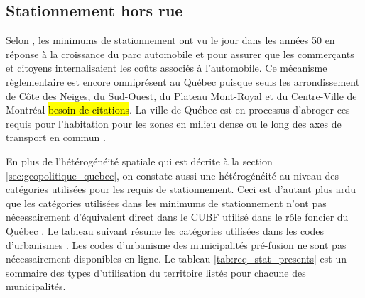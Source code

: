   \subsection{Stationnement hors rue}
  Selon \textcite{Shoup:HighCost:2005}, les minimums de stationnement ont vu le jour dans les années 50 en réponse à la croissance du parc automobile et pour assurer que les commerçants et citoyens internalisaient les coûts associés à l'automobile. Ce mécanisme règlementaire est encore omniprésent au Québec puisque seuls les arrondissement de Côte des Neiges, du Sud-Ouest, du Plateau Mont-Royal et du Centre-Ville de Montréal \hl{besoin de citations}. La ville de Québec est en processus d'abroger ces requis pour l'habitation pour les zones en milieu dense ou le long des axes de transport en commun \parencite{VilledeQuebec:AdoptionReglement:2024}.\par
  En plus de l'hétérogénéité spatiale qui est décrite à la section \ref{sec:geopolitique_quebec}, on constate aussi une hétérogénéité au niveau des catégories utilisées pour les requis de stationnement. Ceci est d'autant plus ardu que les catégories utilisées dans les minimums de stationnement n'ont pas nécessairement d'équivalent direct dans le \ac{CUBF} utilisé dans le rôle foncier du Québec \parencite[Annexe 2C.1]{GouvernementduQuebec:ManuelEvaluation:2024}. Le tableau suivant résume les catégories utilisées dans les codes d'urbanismes \parencite{VilledeQuebec:AdoptionReglement:2024,VilledeQuebec:ReglementZonage:1995}. Les codes d'urbanisme des municipalités pré-fusion ne sont pas nécessairement disponibles en ligne. Le tableau \ref{tab:req_stat_presents} est un sommaire des types d'utilisation du territoire listés pour chacune des municipalités.
  \tiny
